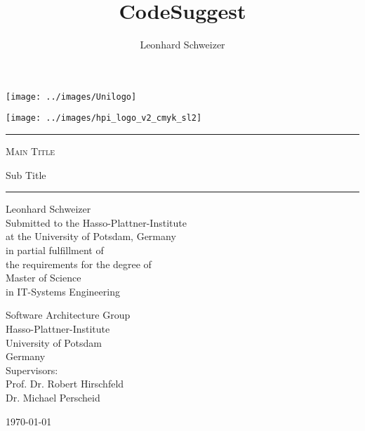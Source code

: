 \title{CodeSuggest}
\author{Leonhard Schweizer}
\begin{titlepage}
\pagestyle{empty}

\noindent
\begin{minipage}[b]{0.4\linewidth}
\noindent
\texttt{[image: ../images/Unilogo]}
\end{minipage}
\hfill
\begin{minipage}[b]{0.4\linewidth}
\hfill
\vspace{3mm}
\texttt{[image: ../images/hpi\_logo\_v2\_cmyk\_sl2]}
\end{minipage}

\vspace{2cm}

\begin{center}
\begin{minipage}{0.7\textwidth}
\begin{center}
\begin{large}
\hrule
\vspace{2em}
\textsc{\Huge Main Title \\[0.5em]}
\begin{doublespace}
  {\LARGE Sub Title}
  \\[1.2em]
\end{doublespace}
\hrule
\vspace{1.5cm}

{\huge Leonhard Schweizer } \\[1.5cm]

Submitted to the Hasso-Plattner-Institute \\
at the University of Potsdam, Germany \\
in partial fulfillment of \\
the requirements for the degree of \\[5mm]
{\Large Master of Science} \\[1mm]
in IT-Systems Engineering \\[2cm]

\begin{multicols}{2}
Software Architecture Group\\
Hasso-Plattner-Institute\\
University of Potsdam \\
Germany \\
Supervisors: \\
Prof. Dr. Robert Hirschfeld \\
Dr. Michael Perscheid \\
\end{multicols}
\end{large}
\end{center}
\end{minipage}
\vfill
{\LARGE \today \\ ~ }
\end{center}
\end{titlepage}
\restoregeometry
\cleardoublepage